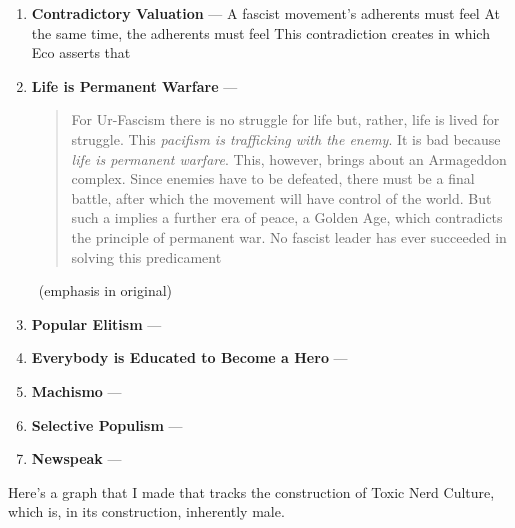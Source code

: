 \documentclass[../butidigress.tex]{subfiles}
\begin{document}
\begin{enumerate}
    \item \textbf{Contradictory Valuation} --- A fascist movement's adherents must feel  At the same time, the adherents must feel  This contradiction creates  in which  Eco asserts that 
    \item \textbf{Life is Permanent Warfare} --- \blockquote[][.]{For Ur-Fascism there is no struggle for life but, rather, life is lived for struggle. This \emph{pacifism is trafficking with the enemy}. It is bad because \emph{life is permanent warfare}. This, however, brings about an Armageddon complex. Since enemies have to be defeated, there must be a final battle, after which the movement will have control of the world. But such a  implies a further era of peace, a Golden Age, which contradicts the principle of permanent war. No fascist leader has ever succeeded in solving this predicament}~(emphasis in original)
    \item \textbf{Popular Elitism} ---
    \item \textbf{Everybody is Educated to Become a Hero} ---
    \item \textbf{Machismo} ---
    \item \textbf{Selective Populism} ---
    \item \textbf{Newspeak} ---
\end{enumerate}

\newpage
{}
Here's a graph that I made that tracks the construction of Toxic Nerd Culture, which is, in its construction, inherently male.

\begin{figure*}[htp]
\centering
{}
\end{figure*}
\end{document}
